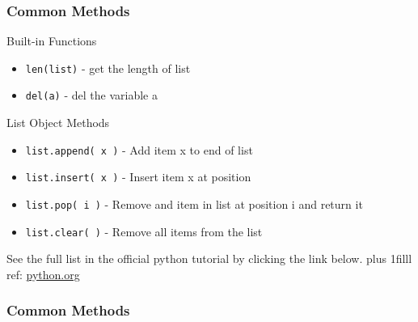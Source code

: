 \documentclass[fleqn]{beamer} %
\newcommand{\sectiontitleIII}{Common Methods}
\newcommand{\btVFill}{\vskip0pt plus 1filll}
\begin{document}
	\begin{frame}[label=sectionIII, containsverbatim] \small
		\frametitle{\sectiontitleIII}

		Built-in Functions 
		\begin{itemize}
			\item \lstinline{len(list)} - get the length of list
			\item \lstinline{del(a)} - del the variable a
		\end{itemize}	

	    List Object Methods
		\begin{itemize}

		\item \lstinline{list.append( x )} - Add item x to end of list \\ 
		\item \lstinline{list.insert( x )} - Insert item x at position \\ 
		\item \lstinline{list.pop( i )} - Remove and item in list at position i and return it \\ 
		\item \lstinline{list.clear( )} - Remove all items from the list \\ 

		\end{itemize}

		\vspace*{10mm}
		See the full list in the official python tutorial by clicking the link below. 
		\btVFill
		\tiny{ref: \href{https://docs.python.org/3/tutorial/datastructures.html#more-on-lists}{python.org}}

	\end{frame}


	\begin{frame} \small
		\frametitle{\sectiontitleIII}
		
		
		
	\end{frame}


\end{document}
